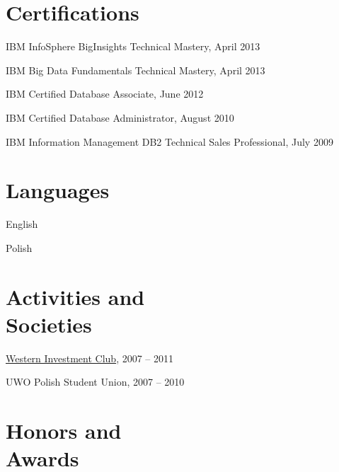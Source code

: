 \documentclass[margin,line]{resume}
\begin{document}
\begin{resume}
\section{\mysidestyle Certifications}

\begin{list2}
	\item IBM InfoSphere BigInsights Technical Mastery, April 2013
	\item IBM Big Data Fundamentals Technical Mastery, April 2013
	\item IBM Certified Database Associate, June 2012
	\item IBM Certified Database Administrator, August 2010
	\item IBM Information Management DB2 Technical Sales Professional, July 2009
\end{list2}

\section{\mysidestyle Languages}

\begin{list2}
	\item English
	\item Polish
\end{list2}

\section{\mysidestyle Activities and\\Societies}

\begin{list2}
	\item \href{http://www.westerninvestmentclub.com/}{Western Investment Club}, 2007 -- 2011
	\item UWO Polish Student Union, 2007 -- 2010
\end{list2}

\section{\mysidestyle Honors and\\Awards}


\end{resume}
\end{document}

